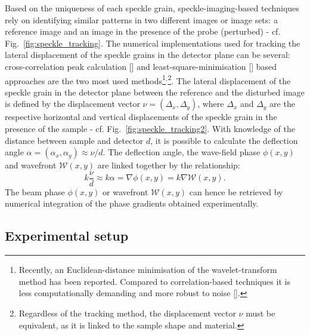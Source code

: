 \begin{refsection}
Based on the uniqueness of each speckle grain, speckle-imaging-based techniques rely on identifying similar patterns in two different images or image sets: a reference image and an image in the presence of the probe (perturbed) - cf. Fig.~\ref{fig:speckle_tracking}. The numerical implementations used for tracking the lateral displacement of the speckle grains in the detector plane can be several: cross-correlation peak calculation [\cite{Berujon2012, Morgan2012}] and least-square-minimisation [\cite{Zanette2014, Zdora2017}] based approaches are the two most used methods\footnote{Recently, an Euclidean-distance minimisation of the wavelet-transform method has been reported. Compared to correlation-based techniques it is less computationally demanding and more robust to noise [\cite{Qiao2020b}].}$^{,}$\footnote{Regardless of the tracking method, the displacement vector $\nu$ must be equivalent, as it is linked to the sample shape and material.}. The lateral displacement of the speckle grain in the detector plane between the reference and the disturbed image is defined by the displacement vector $\nu=(\Delta_x,\Delta_y)$, where $\Delta_x$ and $\Delta_y$ are the respective horizontal and vertical displacements of the speckle grain in the presence of the sample - cf. Fig.~\ref{fig:speckle_tracking2}. With knowledge of the distance between sample and detector $d$, it is possible to calculate the deflection angle $\alpha=(\alpha_x,\alpha_y)\approx\nu/d$. The deflection angle, the wave-field phase $\phi(x,y)$ and wavefront $\mathcal{W}(x,y)$ are linked together by the relationship:
\begin{equation}\label{eq:wavefront_gradient}
    k\frac{\nu}{d} \approx k \alpha = \nabla\phi(x,y) = k \nabla\mathcal{W}(x,y).
\end{equation}
The beam phase $\phi(x,y)$ or wavefront $\mathcal{W}(x,y)$ can hence be retrieved by numerical integration of the phase gradients obtained experimentally.

\subsection{Experimental setup}\label{sec:experimental_setup}


\end{refsection}
